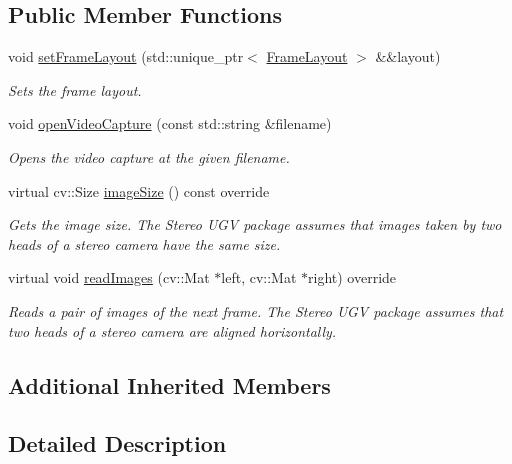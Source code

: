 \subsection*{Public Member Functions}
\begin{DoxyCompactItemize}
\item 
void \hyperlink{classstereo__ugv_1_1CvVideoCaptureImageSource_a70f8c34dd228771d141fee7027cbc211}{set\+Frame\+Layout} (std\+::unique\+\_\+ptr$<$ \hyperlink{classstereo__ugv_1_1FrameLayout}{Frame\+Layout} $>$ \&\&layout)
\begin{DoxyCompactList}\small\item\em Sets the frame layout. \end{DoxyCompactList}\item 
void \hyperlink{classstereo__ugv_1_1CvVideoCaptureImageSource_a47e4a18163b03d4d716284292dbb1d24}{open\+Video\+Capture} (const std\+::string \&filename)
\begin{DoxyCompactList}\small\item\em Opens the video capture at the given filename. \end{DoxyCompactList}\item 
virtual cv\+::\+Size \hyperlink{classstereo__ugv_1_1CvVideoCaptureImageSource_a84dd7dbd0ff6091d68843ca02a18e0cc}{image\+Size} () const override
\begin{DoxyCompactList}\small\item\em Gets the image size. The Stereo U\+GV package assumes that images taken by two heads of a stereo camera have the same size. \end{DoxyCompactList}\item 
virtual void \hyperlink{classstereo__ugv_1_1CvVideoCaptureImageSource_a6636c97811bb28d59453c3865b0bda69}{read\+Images} (cv\+::\+Mat $\ast$left, cv\+::\+Mat $\ast$right) override
\begin{DoxyCompactList}\small\item\em Reads a pair of images of the next frame. The Stereo U\+GV package assumes that two heads of a stereo camera are aligned horizontally. \end{DoxyCompactList}\end{DoxyCompactItemize}
\subsection*{Additional Inherited Members}


\subsection{Detailed Description}
